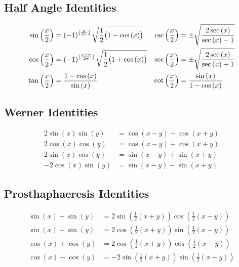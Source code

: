 \documentclass{article}
\begin{document}
\subsection{Half Angle Identities}
\begin{align*}
	\sin{\left( \frac{x}{2} \right)} &= \left( -1 \right)^{\lfloor\frac{x}{2\pi}\rfloor}\sqrt{\frac{1}{2}\bigl(1-\cos{\left( x \right)}\bigr)}     & \csc{\left( \frac{x}{2} \right)} &= \pm \sqrt{\frac{2\sec{\left( x \right)}}{\sec{\left( x \right)}-1}} \\
	\cos{\left( \frac{x}{2} \right)} &= \left( -1 \right)^{\lfloor\frac{x+\pi}{2\pi}\rfloor}\sqrt{\frac{1}{2}\bigl(1+\cos{\left( x \right)}\bigr)} & \sec{\left( \frac{x}{2} \right)} &= \pm \sqrt{\frac{2\sec{\left( x \right)}}{\sec{\left( x \right)}+1}} \\
	\tan{\left( \frac{x}{2} \right)} &= \frac{1-\cos{\left( x \right)}}{\sin{\left( x \right)}}                                              & \cot{\left( \frac{x}{2} \right)} &= \frac{\sin{\left( x \right)}}{1-\cos{\left( x \right)}} 
\end{align*}
\subsection{Werner Identities}
\begin{align*}
	 2\sin{\left( x \right)}\sin{\left( y \right)} &= \cos{\left( x-y \right)}-\cos{\left( x+y \right)} \\
	 2\cos{\left( x \right)}\cos{\left( y \right)} &= \cos{\left( x-y \right)}+\cos{\left( x+y \right)} \\
	 2\sin{\left( x \right)}\cos{\left( y \right)} &= \sin{\left( x-y \right)}+\sin{\left( x+y \right)} \\
    -2\cos{\left( x \right)}\sin{\left( y \right)} &= \sin{\left( x-y \right)}-\sin{\left( x+y \right)}
\end{align*}
\subsection{Prosthaphaeresis Identities}
\begin{align*}
	\sin{\left( x \right)}+\sin{\left( y \right)} &= 2\sin{\left(\frac{1}{2} \left( x+y \right) \right)}\cos{\left( \frac{1}{2} \left( x-y \right) \right)} \\
	\sin{\left( x \right)}-\sin{\left( y \right)} &= 2\cos{\left(\frac{1}{2} \left( x+y \right) \right)}\sin{\left( \frac{1}{2} \left( x-y \right) \right)} \\
	\cos{\left( x \right)}+\cos{\left( y \right)} &= 2\cos{\left(\frac{1}{2} \left( x+y \right) \right)}\cos{\left( \frac{1}{2} \left( x-y \right) \right)} \\
	\cos{\left( x \right)}-\cos{\left( y \right)} &= -2\sin{\left(\frac{1}{2} \left( x+y \right) \right)}\sin{\left( \frac{1}{2} \left( x-y \right) \right)} \\
\end{align*}
\end{document}
